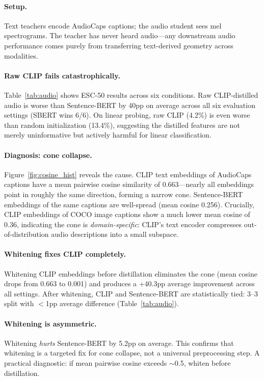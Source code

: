 \documentclass{article}
\begin{document}
\paragraph{Setup.}
Text teachers encode AudioCaps captions; the audio student sees mel spectrograms.
The teacher has never heard audio---any downstream audio performance comes purely from transferring text-derived geometry across modalities.

\paragraph{Raw CLIP fails catastrophically.}
Table~\ref{tab:audio} shows ESC-50 results across six conditions.
Raw CLIP-distilled audio is worse than Sentence-BERT by 40pp on average across all six evaluation settings (SBERT wins 6/6).
On linear probing, raw CLIP (4.2\%) is even worse than random initialization (13.4\%), suggesting the distilled features are not merely uninformative but actively harmful for linear classification.

\paragraph{Diagnosis: cone collapse.}
Figure~\ref{fig:cosine_hist} reveals the cause.
CLIP text embeddings of AudioCaps captions have a mean pairwise cosine similarity of 0.663---nearly all embeddings point in roughly the same direction, forming a narrow cone.
Sentence-BERT embeddings of the same captions are well-spread (mean cosine 0.256).
Crucially, CLIP embeddings of COCO image captions show a much lower mean cosine of 0.36, indicating the cone is \emph{domain-specific}: CLIP's text encoder compresses out-of-distribution audio descriptions into a small subspace.

\paragraph{Whitening fixes CLIP completely.}
Whitening CLIP embeddings before distillation eliminates the cone (mean cosine drops from 0.663 to 0.001) and produces a +40.3pp average improvement across all settings.
After whitening, CLIP and Sentence-BERT are statistically tied: 3--3 split with $<$1pp average difference (Table~\ref{tab:audio}).

\paragraph{Whitening is asymmetric.}
Whitening \emph{hurts} Sentence-BERT by 5.2pp on average.
This confirms that whitening is a targeted fix for cone collapse, not a universal preprocessing step.
A practical diagnostic: if mean pairwise cosine exceeds $\sim$0.5, whiten before distillation.
\end{document}
